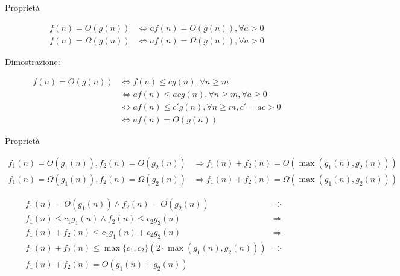 \begin{frame}{Proprietà}

\begin{myboxtitle}
\begin{align*}
  f(n) = O(g(n)) &\Leftrightarrow af(n) = O(g(n)), \forall a>0 \\
  f(n) = \Omega(g(n)) &\Leftrightarrow af(n) = \Omega(g(n)), \forall a>0 
\end{align*}
\end{myboxtitle}

Dimostrazione:

\begin{align*}
  f(n) = O(g(n)) &\Leftrightarrow f(n) \leq cg(n), \forall n \geq m \\
                 &\Leftrightarrow af(n) \leq acg(n), \forall n \geq m, \forall a \geq 0 \\
                 &\Leftrightarrow af(n) \leq c'g(n), \forall n \geq m, c' = ac > 0 \\
                 &\Leftrightarrow af(n) = O(g(n))
\end{align*}

\end{frame}

\begin{frame}{Proprietà}

\begin{myboxtitle}
\small
\begin{align*}
  f_1(n) = O(g_1(n)), f_2(n) = O(g_2(n)) &\Rightarrow f_1(n)+f_2(n) = O(\max(g_1(n), g_2(n))) \\
  f_1(n) = \Omega(g_1(n)), f_2(n) = \Omega(g_2(n)) &\Rightarrow f_1(n)+f_2(n) = \Omega(\max(g_1(n), g_2(n))) 
\end{align*}
\end{myboxtitle}

\begin{myboxtitle}
\begin{eqnarray*}
  f_1(n) = O(g_1(n)) \wedge f_2(n) = O(g_2(n)) &\Rightarrow& \\
    f_1(n) \leq c_1g_1(n) \wedge f_2(n) \leq c_2g_2(n) &\Rightarrow& \\
    f_1(n)+f_2(n) \leq c_1g_1(n) + c_2g_2(n) &\Rightarrow& \\
    f_1(n)+f_2(n) \leq \max\{c_1,c_2\} (2 \cdot \max(g_1(n),g_2(n))) &\Rightarrow& \\
    f_1(n)+f_2(n) = O(g_1(n)+g_2(n))
\end{eqnarray*}
\end{myboxtitle}

\end{frame}

